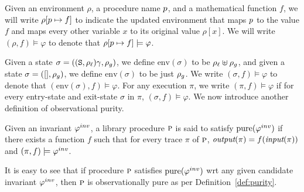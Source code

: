 
Given an environment $\rho$, a procedure name $p$, and a mathematical function $f$, we will write
$\rho[p \mapsto f]$ to indicate the updated environment that maps
$p$ to the value $f$ and maps every
other variable $x$ to its original value $\rho[x]$.
We will write $(\rho,f) \models \varphi$ to denote that $\rho[p \mapsto f] \models \varphi$.

Given a state $\sigma = ((\texttt{S},\rho_\ell)\gamma,\rho_g)$, 
we define $\text{env}(\sigma)$ to be $\rho_\ell \uplus \rho_g$,  and given a
state $\sigma = ([],\rho_g)$, we define $\text{env}(\sigma)$ to be just $\rho_g$.
We write $(\sigma,f) \models \varphi$ to denote that $(\text{env}(\sigma),f) \models \varphi$.
For any execution $\pi$, we write $(\pi,f) \models \varphi$ if for every entry-state and exit-state
$\sigma$ in $\pi$, $(\sigma,f) \models \varphi$.
We now introduce another definition of observational purity.
\begin{definition}
\label{def:pureinv}
Given an invariant $\varphi^{inv}$, 
a library procedure $\textsc{p}$ is said to satisfy $\mathrm{pure}(\varphi^{inv})$ if
there exists a function $f$ such that for every trace $\pi$ of $\textsc{p}$,
$\textit{output}(\pi) = f(\textit{input}(\pi))$ and $(\pi,f) \models \varphi^{inv}$.
\end{definition}
It is easy to see that if procedure $\textsc{p}$ satisfies $\mathrm{pure}(\varphi^{inv})$ wrt any
given candidate invariant $\varphi^{inv}$, then $\textsc{p}$ is observationally pure as
per Definition~\ref{def:purity}. 




